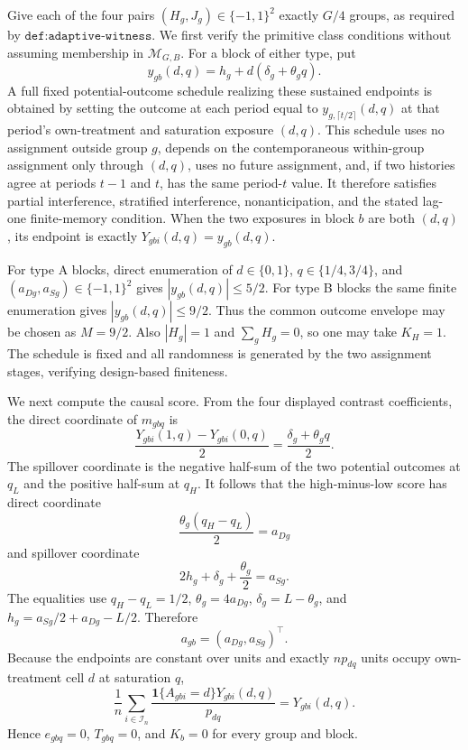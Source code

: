 Give each of the four pairs \((H_g,J_g)\in\{-1,1\}^2\) exactly \(G/4\) groups, as required by \(\texttt{def:adaptive-witness}\).  We first verify the primitive class conditions without assuming membership in \(\mathcal M_{G,B}\).  For a block of either type, put
\[
 y_{gb}(d,q)=h_g+d(\delta_g+\theta_gq).
\]
A full fixed potential-outcome schedule realizing these sustained endpoints is obtained by setting the outcome at each period equal to \(y_{g,\lceil t/2\rceil}(d,q)\) at that period's own-treatment and saturation exposure \((d,q)\).  This schedule uses no assignment outside group \(g\), depends on the contemporaneous within-group assignment only through \((d,q)\), uses no future assignment, and, if two histories agree at periods \(t-1\) and \(t\), has the same period-\(t\) value.  It therefore satisfies partial interference, stratified interference, nonanticipation, and the stated lag-one finite-memory condition.  When the two exposures in block \(b\) are both \((d,q)\), its endpoint is exactly \(Y_{gbi}(d,q)=y_{gb}(d,q)\).

For type A blocks, direct enumeration of \(d\in\{0,1\}\), \(q\in\{1/4,3/4\}\), and \((a_{Dg},a_{Sg})\in\{-1,1\}^2\) gives \(|y_{gb}(d,q)|\leq5/2\).  For type B blocks the same finite enumeration gives \(|y_{gb}(d,q)|\leq9/2\).  Thus the common outcome envelope may be chosen as \(M=9/2\).  Also \(|H_g|=1\) and \(\sum_gH_g=0\), so one may take \(K_H=1\).  The schedule is fixed and all randomness is generated by the two assignment stages, verifying design-based finiteness.

We next compute the causal score.  From the four displayed contrast coefficients, the direct coordinate of \(m_{gbq}\) is
\[
 \frac{Y_{gbi}(1,q)-Y_{gbi}(0,q)}2
 =\frac{\delta_g+\theta_gq}{2}.
\]
The spillover coordinate is the negative half-sum of the two potential outcomes at \(q_L\) and the positive half-sum at \(q_H\).  It follows that the high-minus-low score has direct coordinate
\[
 \frac{\theta_g(q_H-q_L)}2=a_{Dg}
\]
and spillover coordinate
\[
 2h_g+\delta_g+\frac{\theta_g}{2}=a_{Sg}.
\]
The equalities use \(q_H-q_L=1/2\), \(\theta_g=4a_{Dg}\), \(\delta_g=L-\theta_g\), and
\(h_g=a_{Sg}/2+a_{Dg}-L/2\).  Therefore
\[
 a_{gb}=(a_{Dg},a_{Sg})^\top.                              \tag{10}
\]
Because the endpoints are constant over units and exactly \(np_{dq}\) units occupy own-treatment cell \(d\) at saturation \(q\),
\[
 \frac1n\sum_{i\in\mathcal I_n}
 \frac{\mathbf1\{A_{gbi}=d\}Y_{gbi}(d,q)}{p_{dq}}
 =Y_{gbi}(d,q).
\]
Hence \(e_{gbq}=0\), \(T_{gbq}=0\), and \(K_b=0\) for every group and block.

